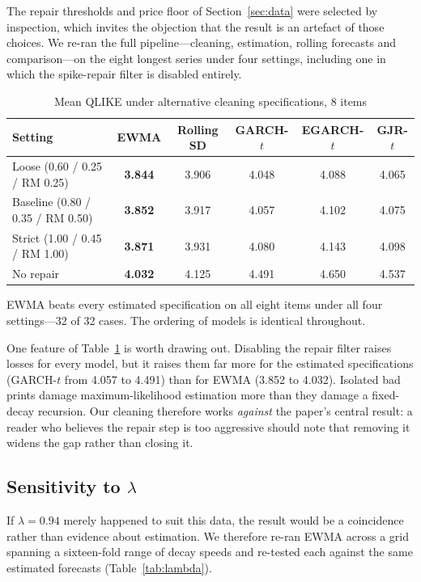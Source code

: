\documentclass[11pt,a4paper]{article}
\begin{document}
The repair thresholds and price floor of Section~\ref{sec:data} were selected
by inspection, which invites the objection that the result is an artefact of
those choices. We re-ran the full pipeline---cleaning, estimation, rolling
forecasts and comparison---on the eight longest series under four settings,
including one in which the spike-repair filter is disabled entirely.

\begin{table}[htbp]
\centering
\caption{Mean QLIKE under alternative cleaning specifications, 8 items}
\label{tab:robust}
\begin{tabular}{lccccc}
\toprule
Setting & EWMA & Rolling SD & GARCH-$t$ & EGARCH-$t$ & GJR-$t$ \\
\midrule
Loose (0.60 / 0.25 / RM 0.25)  & \textbf{3.844} & 3.906 & 4.048 & 4.088 & 4.065 \\
Baseline (0.80 / 0.35 / RM 0.50) & \textbf{3.852} & 3.917 & 4.057 & 4.102 & 4.075 \\
Strict (1.00 / 0.45 / RM 1.00) & \textbf{3.871} & 3.931 & 4.080 & 4.143 & 4.098 \\
No repair                      & \textbf{4.032} & 4.125 & 4.491 & 4.650 & 4.537 \\
\bottomrule
\end{tabular}
\end{table}

EWMA beats every estimated specification on all eight items under all four
settings---32 of 32 cases. The ordering of models is identical throughout.

One feature of Table~\ref{tab:robust} is worth drawing out. Disabling the
repair filter raises losses for every model, but it raises them far more for
the estimated specifications (GARCH-$t$ from 4.057 to 4.491) than for EWMA
(3.852 to 4.032). Isolated bad prints damage maximum-likelihood estimation more
than they damage a fixed-decay recursion. Our cleaning therefore works
\emph{against} the paper's central result: a reader who believes the repair
step is too aggressive should note that removing it widens the gap rather than
closing it.

\subsection{\texorpdfstring{Sensitivity to $\lambda$}{Sensitivity to lambda}}

If $\lambda = 0.94$ merely happened to suit this data, the result would be a
coincidence rather than evidence about estimation. We therefore re-ran EWMA
across a grid spanning a sixteen-fold range of decay speeds and re-tested each
against the same estimated forecasts (Table~\ref{tab:lambda}).
\end{document}
